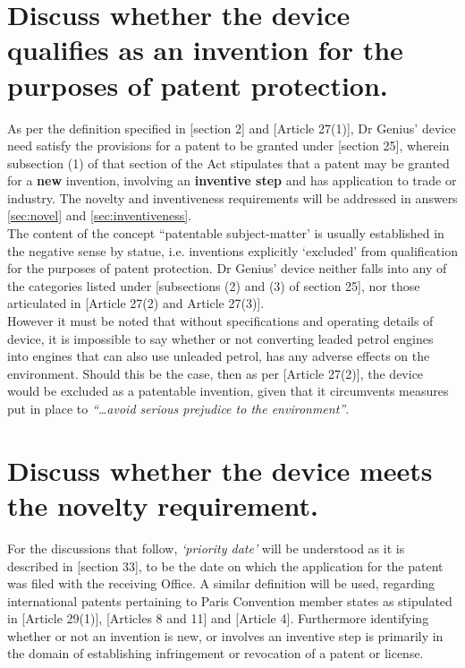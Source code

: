 \documentclass[11pt]{article}
\begin{document}
\section{Discuss whether the device qualifies as an invention for the purposes of patent protection.}
\label{sec:org1f3a84a}
\label{sec:invention}

As per the definition specified in [section 2]\cite{rsa78_patents_act} and [Article 27(1)]\cite{wto17_trips}, Dr Genius' device need satisfy the provisions for a patent to be granted under [section 25]\cite{rsa78_patents_act}, wherein subsection (1) of that section of the Act stipulates that a patent may be granted for a \textbf{new} invention, involving an \textbf{inventive step} and has application to trade or industry. The novelty and inventiveness requirements will be addressed in answers \ref{sec:novel} and \ref{sec:inventiveness}.\\

The content of the concept ``patentable subject-matter' is usually established in the negative sense by statue, i.e. inventions explicitly `excluded' from qualification for the purposes of patent protection. Dr Genius' device neither falls into any of the categories listed under [subsections (2) and (3) of section 25]\cite{rsa78_patents_act}, nor those articulated in [Article 27(2) and Article 27(3)]\cite{wto17_trips}.\\

However it must be noted that without specifications and operating details of device, it is impossible to say whether or not converting leaded petrol engines into engines that can also use unleaded petrol, has any adverse effects on the environment. Should this be the case, then as per [Article 27(2)]\cite{wto17_trips}, the device would be excluded as a patentable invention, given that it circumvents measures put in place to \emph{``\ldots{}avoid serious prejudice to the environment''}.

\section{Discuss whether the device meets the novelty requirement.}
\label{sec:orgae2783a}
\label{sec:novel}

For the discussions that follow, \emph{`priority date'} will be understood as it is
described in [section 33]\cite{rsa78_patents_act}, to be the date on which the
application for the patent was filed with the receiving Office. A similar
definition will be used, regarding international patents pertaining to Paris
Convention member states as stipulated in [Article 29(1)]\cite{wto17_trips},
[Articles 8 and 11]\cite{wipo70_pct} and [Article 4]\cite{wipo83_paris_conve_protect_ip}. Furthermore identifying whether or not an invention is new, or involves an inventive step is primarily in the domain of establishing infringement or revocation of a patent or license.\\
\end{document}
